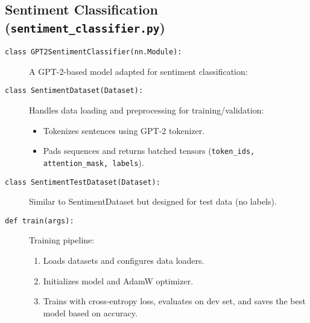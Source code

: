 \subsection{Sentiment Classification (\texttt{sentiment\_classifier.py})}
\begin{description}

\item[\texttt{class GPT2SentimentClassifier(nn.Module):}]
A GPT-2-based model adapted for sentiment classification:

\item[\texttt{class SentimentDataset(Dataset):}]
Handles data loading and preprocessing for training/validation:
\begin{itemize}
\item Tokenizes sentences using GPT-2 tokenizer.
\item Pads sequences and returns batched tensors (\texttt{token\_ids, attention\_mask, labels}).
\end{itemize}

\item[\texttt{class SentimentTestDataset(Dataset):}]
Similar to SentimentDataset but designed for test data (no labels).

\item[\texttt{def train(args):}]
Training pipeline:
\begin{enumerate}
\item Loads datasets and configures data loaders.
\item Initializes model and AdamW optimizer.
\item Trains with cross-entropy loss, evaluates on dev set, and saves the best model based on accuracy.
\end{enumerate}


\end{description}
